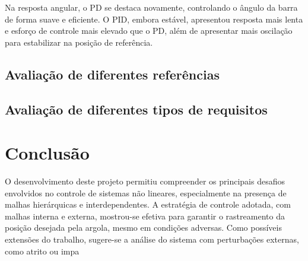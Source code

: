 \documentclass[a4paper, 12pt]{article} %
\begin{document}
Na resposta angular, o PD se destaca novamente, controlando o ângulo da barra de forma suave e eficiente. O PID, embora estável, apresentou resposta mais lenta e esforço de controle mais elevado que o PD, além de apresentar mais oscilação para estabilizar na posição de referência.

\subsection{Avaliação de diferentes referências}


\subsection{Avaliação de diferentes tipos de requisitos}


\section{Conclusão}
O desenvolvimento deste projeto permitiu compreender os principais desafios envolvidos no controle de sistemas não lineares, especialmente na presença de malhas hierárquicas e interdependentes. A estratégia de controle adotada, com malhas interna e externa, mostrou-se efetiva para garantir o rastreamento da posição desejada pela argola, mesmo em condições adversas. Como possíveis extensões do trabalho, sugere-se a análise do sistema com perturbações externas, como atrito ou impa
\end{document}
